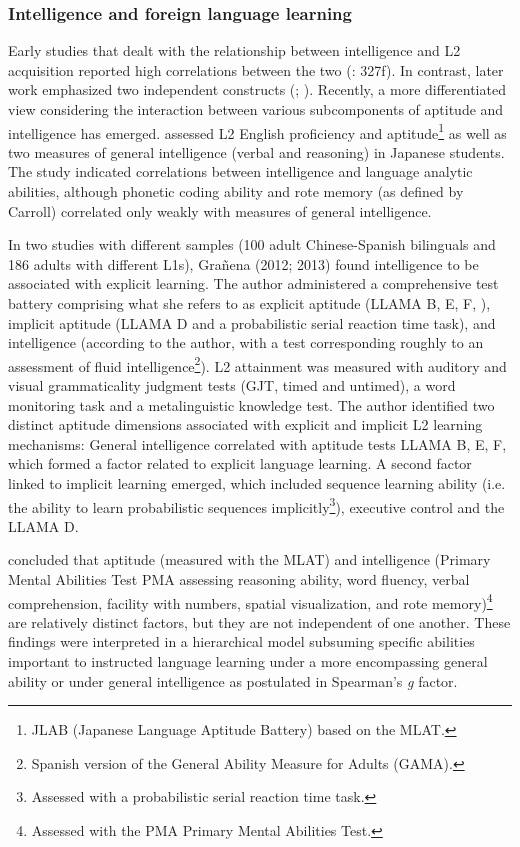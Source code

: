 \documentclass[output=paper]{langscibook}
\begin{document}
\subsubsection{Intelligence and foreign language learning} %

Early studies that dealt with the relationship between intelligence and L2 acquisition reported high correlations between the two (\citealt{Spolsky1995}: 327f). In contrast, later work emphasized two independent constructs (\citealt{GardnerLambert1965}; \citealt{Skehan1986}). Recently, a more differentiated view considering the interaction between various subcomponents of aptitude and intelligence has emerged. \citet{Sasaki1996} assessed L2 English proficiency and aptitude\footnote{JLAB (Japanese Language Aptitude Battery) based on the MLAT.} as well as two measures of general intelligence (verbal and reasoning) in Japanese students. The study indicated correlations between intelligence and language analytic abilities, although phonetic coding ability and rote memory (as defined by Carroll) correlated only weakly with measures of general intelligence. 

In two studies with different samples (100 adult Chinese-Spanish bilinguals and 186 adults with different L1s), Grañena (2012; 2013) found intelligence to be associated with explicit learning. The author administered a comprehensive test battery comprising what she refers to as explicit aptitude (LLAMA B, E, F, \citealt{MearaEtAl2001}), implicit aptitude (LLAMA D and a probabilistic serial reaction time task), and intelligence (according to the author, with a test corresponding roughly to an assessment of fluid intelligence\footnote{Spanish version of the General Ability Measure for Adults (GAMA).}). L2 attainment was measured with auditory and visual grammaticality judgment tests (GJT, timed and untimed), a word monitoring task and a metalinguistic knowledge test. The author identified two distinct aptitude dimensions associated with explicit and implicit L2 learning mechanisms: General intelligence correlated with aptitude tests LLAMA B, E, F, which formed a factor related to explicit language learning. A second factor linked to implicit learning emerged, which included sequence learning ability (i.e. the ability to learn probabilistic sequences implicitly\footnote{Assessed with a probabilistic serial reaction time task.}), executive control and the LLAMA D.

\citet{WescheEtAl1982} concluded that aptitude (measured with the MLAT) and intelligence (Primary Mental Abilities Test PMA assessing reasoning ability, word fluency, verbal comprehension, facility with numbers, spatial visualization, and rote memory)\footnote{Assessed with the PMA Primary Mental Abilities Test.} are relatively distinct factors, but they are not independent of one another. These findings were interpreted in a hierarchical model subsuming specific abilities important to instructed language learning under a more encompassing general ability or under general intelligence as postulated in Spearman’s \textit{g} factor. 
\end{document}

